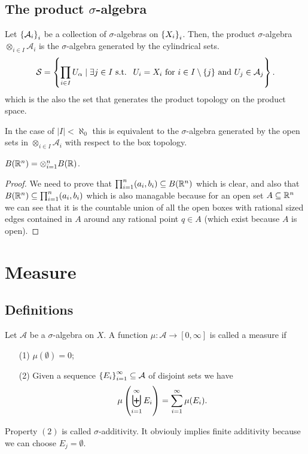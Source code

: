 \documentclass[11pt,a4paper]{article}
\newcommand{\A}{\mathcal A}
\begin{document}
\subsection{The product \texorpdfstring{$\sigma$}{s}-algebra}

\begin{definition}
  Let $\set{\A_{i}}_{i}$ be a collection of $\sigma$-algebras on
  $\set{X_{i}}_{i}$.
  Then, the product $\sigma$-algebra $\otimes_{i \in I} \A_{i}$ is
  the $\sigma$-algebra generated by the cylindrical sets.
  \[
    \mathcal{S} = \set{\prod_{i \in I}{U_{\alpha}} \mid 
    \exists j \in I \st 
    \text{ $U_{i} = X_{i}$ 
    for $i \in I \setminus \{j\}$ and $U_j \in \A_j$}}.
  \]
  which is the also the set that generates the product topology on
  the product space.
\end{definition}
\begin{remark}
  In the case of $|I| < \aleph_0$ this is equivalent to the $\sigma$-algebra
  generated by the open sets in $\otimes_{i \in I} \A_i$ with respect to the
  box topology.
\end{remark}

\begin{proposition}
  $B(\mathbb{R}^n) = \otimes_{i=1}^{n} B(\mathbb{R})$.
\end{proposition}
\begin{proof}
  We need to prove that $\prod_{i=1}^{n} (a_i, b_i) \subseteq B(\mathbb{R}^n)$
  which is clear, and also that $B(\mathbb{R}^n) \subseteq \prod_{i=1}^{n} (a_i, b_i)$
  which is also managable because for an open set $A \subseteq \mathbb{R}^n$ we
  can see that it is the countable union of all the open boxes with
  rational sized edges contained in $A$ around any rational point $q \in A$
  (which exist because $A$ is open).
\end{proof}

\section{Measure}
\subsection{Definitions}

\begin{definition}[Measure]
  Let $\A$ be a $\sigma$-algebra on $X$.
  A function $\mu \colon \A \to [0,\infty]$ is called a measure if
  \begin{enumerate}
  \item[(1)] $\mu(\emptyset) = 0$;
  \item[(2)] Given a sequence $\set{E_i}_{i=1}^{\infty} \subseteq \A$ of
    disjoint sets we have
    \[
      \mu\del{\biguplus_{i=1}^{\infty} E_i} =
      \sum_{i=1}^{\infty} \mu(E_i).
    \]
  \end{enumerate}
\end{definition}
\begin{remark}
  Property $(2)$ is called $\sigma$-additivity.
  It obviouly implies finite additivity because we can choose 
  $E_j = \emptyset$.
\end{remark}
\end{document}
